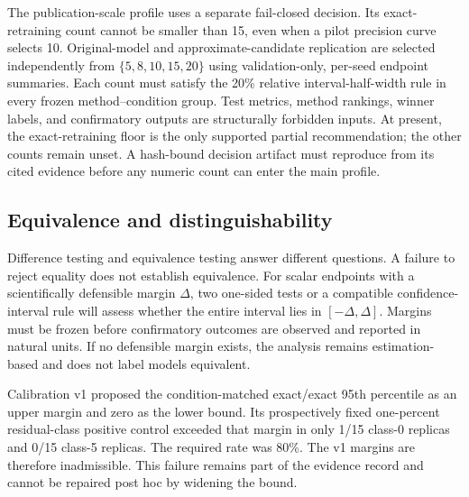 The publication-scale profile uses a separate fail-closed decision.  Its exact-retraining
count cannot be smaller than 15, even when a pilot precision curve selects 10.  Original-model
and approximate-candidate replication are selected independently from
$\{5,8,10,15,20\}$ using validation-only, per-seed endpoint summaries.  Each count must satisfy
the 20\% relative interval-half-width rule in every frozen method--condition group.  Test
metrics, method rankings, winner labels, and confirmatory outputs are structurally forbidden
inputs.  At present, the exact-retraining floor is the only supported partial recommendation;
the other counts remain unset.  A hash-bound decision artifact must reproduce from its cited
evidence before any numeric count can enter the main profile.

\subsection{Equivalence and distinguishability}
Difference testing and equivalence testing answer different questions.  A failure to reject
equality does not establish equivalence.  For scalar endpoints with a scientifically
defensible margin $\Delta$, two one-sided tests or a compatible confidence-interval rule
will assess whether the entire interval lies in $[-\Delta,\Delta]$.  Margins must be frozen
before confirmatory outcomes are observed and reported in natural units.  If no defensible
margin exists, the analysis remains estimation-based and does not label models equivalent.

Calibration v1 proposed the condition-matched exact/exact 95th percentile as an upper margin
and zero as the lower bound.  Its prospectively fixed one-percent residual-class positive
control exceeded that margin in only 1/15 class-0 replicas and 0/15 class-5 replicas.  The
required rate was 80\%.  The v1 margins are therefore inadmissible.  This failure remains part
of the evidence record and cannot be repaired post hoc by widening the bound.

